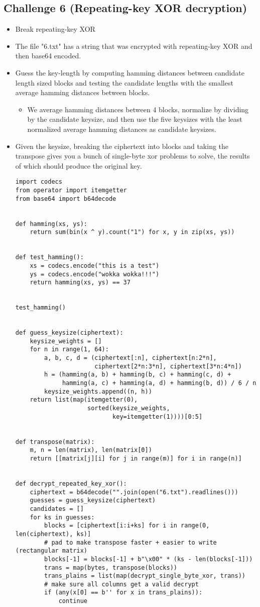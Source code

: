 \documentclass[11pt]{article}
\begin{document}
\subsection{Challenge 6 (Repeating-key XOR decryption)}
\label{sec:orgc866705}
\begin{itemize}
\item Break repeating-key XOR
\item The file "6.txt" has a string that was encrypted with repeating-key XOR and then base64 encoded.
\item Guess the key-length by computing hamming distances between candidate length sized blocks and testing the candidate lengths with the smallest average hamming distances between blocks.
\begin{itemize}
\item We average hamming distances between 4 blocks, normalize by dividing by the candidate keysize, and then use the five keysizes with the least normalized average hamming distances as candidate keysizes.
\end{itemize}
\item Given the keysize, breaking the ciphertext into blocks and taking the transpose gives you a bunch of single-byte xor problems to solve, the results of which should produce the original key.
\begin{verbatim}
import codecs
from operator import itemgetter
from base64 import b64decode


def hamming(xs, ys):
    return sum(bin(x ^ y).count("1") for x, y in zip(xs, ys))


def test_hamming():
    xs = codecs.encode("this is a test")
    ys = codecs.encode("wokka wokka!!!")
    return hamming(xs, ys) == 37


test_hamming()


def guess_keysize(ciphertext):
    keysize_weights = []
    for n in range(1, 64):
        a, b, c, d = (ciphertext[:n], ciphertext[n:2*n],
                      ciphertext[2*n:3*n], ciphertext[3*n:4*n])
        h = (hamming(a, b) + hamming(b, c) + hamming(c, d) +
             hamming(a, c) + hamming(a, d) + hamming(b, d)) / 6 / n
        keysize_weights.append((n, h))
    return list(map(itemgetter(0),
                    sorted(keysize_weights,
                           key=itemgetter(1))))[0:5]


def transpose(matrix):
    m, n = len(matrix), len(matrix[0])
    return [[matrix[j][i] for j in range(m)] for i in range(n)]


def decrypt_repeated_key_xor():
    ciphertext = b64decode("".join(open("6.txt").readlines()))
    guesses = guess_keysize(ciphertext)
    candidates = []
    for ks in guesses:
        blocks = [ciphertext[i:i+ks] for i in range(0, len(ciphertext), ks)]
        # pad to make transpose faster + easier to write (rectangular matrix)
        blocks[-1] = blocks[-1] + b"\x00" * (ks - len(blocks[-1]))
        trans = map(bytes, transpose(blocks))
        trans_plains = list(map(decrypt_single_byte_xor, trans))
        # make sure all columns get a valid decrypt
        if (any(x[0] == b'' for x in trans_plains)):
            continue


\end{verbatim}
\end{itemize}
\end{document}
